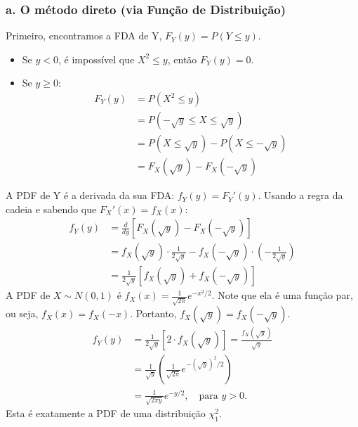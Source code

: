 \documentclass[12pt]{article}
\begin{document}
\subsubsection*{a. O método direto (via Função de Distribuição)}
Primeiro, encontramos a FDA de Y, $F_Y(y) = P(Y \le y)$.
\begin{itemize}
    \item Se $y < 0$, é impossível que $X^2 \le y$, então $F_Y(y) = 0$.
    \item Se $y \ge 0$:
    \begin{align*}
        F_Y(y) &= P(X^2 \le y) \\
        &= P(-\sqrt{y} \le X \le \sqrt{y}) \\
        &= P(X \le \sqrt{y}) - P(X \le -\sqrt{y}) \\
        &= F_X(\sqrt{y}) - F_X(-\sqrt{y})
    \end{align*}
\end{itemize}
A PDF de Y é a derivada da sua FDA: $f_Y(y) = F_Y'(y)$. Usando a regra da cadeia e sabendo que $F_X'(x) = f_X(x)$:
\begin{align*}
    f_Y(y) &= \frac{d}{dy} [F_X(\sqrt{y}) - F_X(-\sqrt{y})] \\
    &= f_X(\sqrt{y}) \cdot \frac{1}{2\sqrt{y}} - f_X(-\sqrt{y}) \cdot \left(-\frac{1}{2\sqrt{y}}\right) \\
    &= \frac{1}{2\sqrt{y}} [f_X(\sqrt{y}) + f_X(-\sqrt{y})]
\end{align*}
A PDF de $X \sim N(0,1)$ é $f_X(x) = \frac{1}{\sqrt{2\pi}}e^{-x^2/2}$. Note que ela é uma função par, ou seja, $f_X(x)=f_X(-x)$. Portanto, $f_X(\sqrt{y}) = f_X(-\sqrt{y})$.
\begin{align*}
    f_Y(y) &= \frac{1}{2\sqrt{y}} [2 \cdot f_X(\sqrt{y})] = \frac{f_X(\sqrt{y})}{\sqrt{y}} \\
    &= \frac{1}{\sqrt{y}} \left( \frac{1}{\sqrt{2\pi}} e^{-(\sqrt{y})^2/2} \right) \\
    &= \frac{1}{\sqrt{2\pi y}} e^{-y/2}, \quad \text{para } y > 0.
\end{align*}
Esta é exatamente a PDF de uma distribuição $\chi^2_1$.
\end{document}
